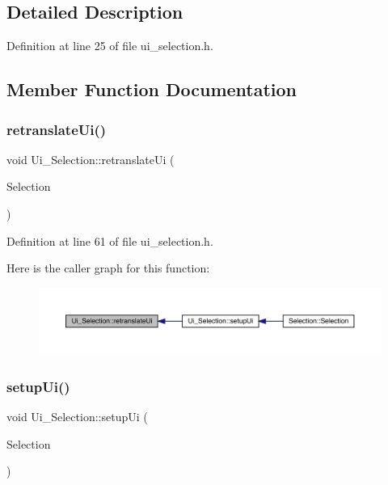 \subsection{Detailed Description}


Definition at line 25 of file ui\+\_\+selection.\+h.



\subsection{Member Function Documentation}
\mbox{\label{class_ui___selection_a2c2db01b357fad240f45ad4c4dc93ad3}} 
\subsubsection{\texorpdfstring{retranslate\+Ui()}{retranslateUi()}}
{\footnotesize\ttfamily void Ui\+\_\+\+Selection\+::retranslate\+Ui (\begin{DoxyParamCaption}\item[{Q\+Main\+Window $\ast$}]{Selection }\end{DoxyParamCaption})\hspace{0.3cm}{\ttfamily [inline]}}



Definition at line 61 of file ui\+\_\+selection.\+h.

Here is the caller graph for this function\+:
\nopagebreak
\begin{figure}[H]
\begin{center}
\leavevmode
\includegraphics[width=350pt]{class_ui___selection_a2c2db01b357fad240f45ad4c4dc93ad3_icgraph}
\end{center}
\end{figure}
\mbox{\label{class_ui___selection_a322e6793d2b12efe827615c705a923a2}} 
\subsubsection{\texorpdfstring{setup\+Ui()}{setupUi()}}
{\footnotesize\ttfamily void Ui\+\_\+\+Selection\+::setup\+Ui (\begin{DoxyParamCaption}\item[{Q\+Main\+Window $\ast$}]{Selection }\end{DoxyParamCaption})\hspace{0.3cm}{\ttfamily [inline]}}




